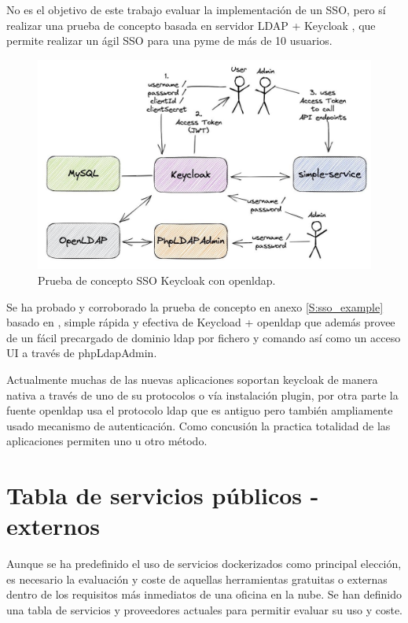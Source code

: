 No es el objetivo de este trabajo evaluar la implementación de un SSO, pero sí realizar una prueba de concepto basada en servidor LDAP\cite{c_ldap} + Keycloak\cite{c_keycloak} , que permite realizar un ágil SSO para una pyme de más de 10 usuarios.
\begin{figure}[!htb]
\begin{center}
\includegraphics[width=1\textwidth]{./figuras/openldap_keycloak.jpeg}
\caption{Prueba de concepto\cite{c_openldap_keycloak} SSO Keycloak con openldap.}
\label{F:openldap_keycloak}
\end{center}
\end{figure}
Se ha probado y corroborado la prueba de concepto en anexo \ref{S:sso_example} basado en \cite{c_openldap_keycloak}, simple rápida y efectiva de Keycload + openldap que además provee de un fácil precargado de dominio ldap por fichero y comando así como un acceso UI a través de phpLdapAdmin\cite{c_php_ldap_admin}.

Actualmente muchas de las nuevas aplicaciones soportan keycloak de manera nativa a través de uno de su protocolos o vía instalación plugin, por otra parte la fuente openldap usa el protocolo ldap que es antiguo pero también ampliamente usado mecanismo de autenticación. Como concusión la practica totalidad de las aplicaciones permiten uno u otro método.

\section{Tabla de servicios públicos - externos}
Aunque se ha predefinido el uso de servicios dockerizados como principal elección, es necesario la evaluación y coste de aquellas herramientas gratuitas o externas dentro de los requisitos más inmediatos de una oficina en la nube. Se han definido una tabla de servicios y proveedores actuales para permitir evaluar su uso y coste.

